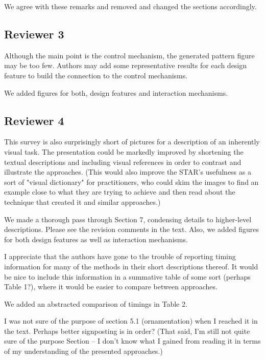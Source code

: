 \documentclass{egpubl}
\newcommand{\rev}[2]{{\color{greenrev}\textsuperscript{#1}#2}}
\renewcommand{\rev}[2]{{#2}}
\begin{document}
\rev{Comment}{We agree with these remarks and removed and changed the sections accordingly.}


\subsection*{Reviewer 3}


Although the main point is the control mechanism, the generated pattern figure may be too few. Authors may add some representative results for each design feature to build the connection to the control mechanisms.

\rev{Comments}{We added figures for both, design features and interaction mechanisms.}


\subsection*{Reviewer 4} 

This survey is also surprisingly short of pictures for a description of an inherently visual task. The presentation could be markedly improved by shortening the textual descriptions and including visual references in order to contrast and illustrate the approaches. (This would also improve the STAR's usefulness as a sort of "visual dictionary" for practitioners, who could skim the images to find an example close to what they are trying to achieve and then read about the technique that created it and similar approaches.)

\rev{Comment}{We made a thorough pass through Section 7, condensing details to higher-level descriptions. Please see the revision comments in the text. Also, we added figures for both design features as well as interaction mechanisms.}

I appreciate that the authors have gone to the trouble of reporting timing information for many of the methods in their short descriptions thereof. It would be nice to include this information in a summative table of some sort (perhaps Table 1?), where it would be easier to compare between approaches.

\rev{Comment}{We added an abstracted comparison of timings in Table 2.}

I was not sure of the purpose of section 5.1 (ornamentation) when I reached it in the text. Perhaps better signposting is in order? (That said, I'm still not quite sure of the purpose Section -- I don't know what I gained from reading it in terms of my understanding of the presented approaches.)
\end{document}
